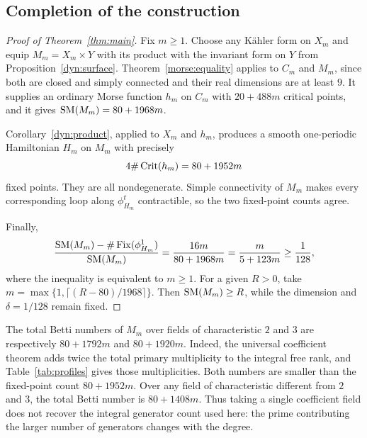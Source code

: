 \subsection{Completion of the construction}
\begin{proof}[Proof of Theorem~\ref{thm:main}]
Fix $m\geq1$. Choose any Kähler form on $X_m$ and equip
$M_m=X_m\times Y$ with its product with the invariant form on $Y$ from
Proposition~\ref{dyn:surface}. Theorem~\ref{morse:equality} applies to
$C_m$ and $M_m$, since both are closed and simply connected and their
real dimensions are at least $9$. It supplies an ordinary Morse function
$h_m$ on $C_m$ with $20+488m$ critical points, and it gives
$\operatorname{SM}(M_m)=80+1968m$.

Corollary~\ref{dyn:product}, applied to $X_m$ and $h_m$, produces a smooth
one-periodic Hamiltonian $H_m$ on $M_m$ with precisely
\[
 4\#\operatorname{Crit}(h_m)=80+1952m
\]
fixed points. They are all nondegenerate. Simple connectivity of $M_m$
makes every corresponding loop along $\phi_{H_m}^t$ contractible, so the
two fixed-point counts agree.

Finally,
\[
 \frac{\operatorname{SM}(M_m)-\#\operatorname{Fix}(\phi_{H_m}^1)}{\operatorname{SM}(M_m)}
 =\frac{16m}{80+1968m}
 =\frac{m}{5+123m}\geq\frac1{128},
\]
where the inequality is equivalent to $m\geq1$.
For a given $R>0$, take
$m=\max\{1,\lceil(R-80)/1968\rceil\}$. Then
$\operatorname{SM}(M_m)\geq R$, while the dimension and $\delta=1/128$ remain fixed.
\end{proof}

\begin{remark}\label{counts:field-bounds}
The total Betti numbers of $M_m$ over fields of characteristic $2$ and $3$
are respectively $80+1792m$ and $80+1920m$. Indeed, the universal coefficient
theorem adds twice the total primary multiplicity to the integral free
rank, and Table~\ref{tab:profiles} gives those multiplicities. Both
numbers are smaller than the fixed-point count $80+1952m$. Over any
field of characteristic different from $2$ and $3$, the total Betti
number is $80+1408m$. Thus taking a single
coefficient field does not recover the integral generator count used here:
the prime contributing the larger number of generators changes with the
degree.
\end{remark}

